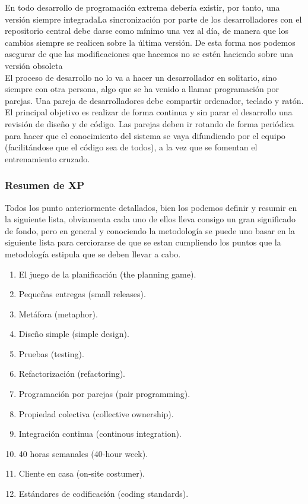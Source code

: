 \documentclass[12pt]{article} %
\begin{document}
			En todo desarrollo de programación extrema debería existir, por tanto, una versión siempre integradaLa sincronización por parte de los desarrolladores con el
			repositorio central debe darse como mínimo una vez al día, de manera que los cambios siempre se realicen sobre la última versión. De esta forma nos podemos asegurar
			de que las modificaciones que hacemos no se estén haciendo sobre una versión obsoleta\\
			
			El proceso de desarrollo no lo va a hacer un desarrollador en solitario, sino siempre con otra persona, algo que se ha venido a llamar programación por parejas. Una
			pareja de desarrolladores debe compartir ordenador, teclado y ratón. El principal objetivo es realizar de forma continua y sin parar el desarrollo una revisión de
			diseño y de código. Las parejas deben ir rotando de forma periódica para hacer que el conocimiento del sistema se vaya difundiendo por el equipo (facilitándose que el
			código sea de todos), a la vez que se fomentan el entrenamiento cruzado.
		\subsubsection{Resumen de XP}
			Todos los punto anteriormente detallados, bien los podemos definir y resumir en la siguiente lista, obviamenta cada uno de ellos lleva consigo un gran significado de
			fondo, pero en general  y conociendo la metodología se puede uno basar en la siguiente lista para cerciorarse de que se estan cumpliendo los puntos que la metodología
			estipula que se deben llevar a cabo.
			
			\begin{enumerate}
				\item El juego de la planificación (the planning game).
				\item Pequeñas entregas (small releases).
				\item Metáfora (metaphor).
				\item Diseño simple (simple design).
				\item Pruebas (testing).
				\item Refactorización (refactoring).
				\item Programación por parejas (pair programming).
				\item Propiedad colectiva (collective ownership).
				\item Integración continua (continous integration).
				\item 40 horas semanales (40-hour week).
				\item Cliente en casa (on-site costumer).
				\item Estándares de codificación (coding standards).
			\end{enumerate}
			
\end{document}
